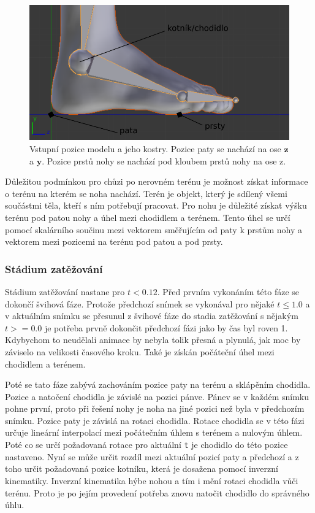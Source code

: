 \begin{figure}[h]
	\centering
	\includegraphics[width=0.7\linewidth]{fig/pozice_paty.pdf}
	\caption{Vstupní pozice modelu a jeho kostry. Pozice paty se nachází na ose $\mathbf{z}$ a $\mathbf{y}$. Pozice prstů nohy se nachází pod kloubem prstů nohy na ose z.}
	\label{fig:pozice_paty}
\end{figure}

Důležitou podmínkou pro chůzi po nerovném terénu je možnost získat informace o terénu na kterém se noha nachází. Terén je objekt, který je sdílený všemi součástmi těla, kteří s ním potřebují pracovat. Pro nohu je důležité získat výšku terénu pod patou nohy a úhel mezi chodidlem a terénem. Tento úhel se určí pomocí skalárního součinu mezi vektorem směřujícím od paty k prstům nohy a vektorem mezi pozicemi na terénu pod patou a pod prsty. 

\subsubsection{Stádium zatěžování}
Stádium zatěžování nastane pro $t < 0.12$. Před prvním vykonáním této fáze se dokončí švihová fáze. Protože předchozí snímek se vykonával pro nějaké $t \leq 1.0$ a v aktuálním snímku se přesunul z švihové fáze do stadia zatěžování s nějakým $t >= 0.0$ je potřeba prvně dokončit předchozí fázi jako by čas byl roven 1. Kdybychom to neudělali animace by nebyla tolik přesná a plynulá, jak moc by záviselo na velikosti časového kroku. Také je získán počáteční úhel mezi chodidlem a terénem. 

Poté se tato fáze zabývá zachováním pozice paty na terénu a sklápěním chodidla. Pozice a natočení chodidla je závislé na pozici pánve. Pánev se v každém snímku pohne první, proto při řešení nohy je noha na jiné pozici než byla v předchozím snímku. Pozice paty je závislá na rotaci chodidla. Rotace chodidla se v této fázi určuje lineární interpolací mezi počátečním úhlem s terénem a nulovým úhlem. Poté co se určí požadovaná rotace pro aktuální \texttt{t} je chodidlo do této pozice nastaveno. Nyní se může určit rozdíl mezi aktuální pozicí paty a předchozí a z toho určit požadovaná pozice kotníku, která je dosažena pomocí inverzní kinematiky. Inverzní kinematika hýbe nohou a tím i mění rotaci chodidla vůči terénu. Proto je po jejím provedení potřeba znovu natočit chodidlo do správného úhlu.

